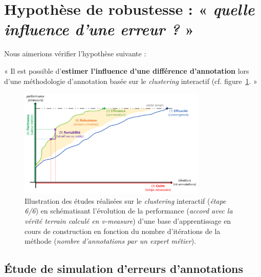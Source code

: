 \section{Hypothèse de robustesse : « \textit{quelle influence d'une erreur ?} »}
\label{section:4.6-HYPOTHESE-ROBUSTESSE}

	Nous aimerions vérifier l'hypothèse suivante :

	\begin{tcolorbox}[
		title=\faVial~\textbf{Hypothèse de robustesse}~\faVial,
		colback=colorTcolorboxHypothesis!15,  %
		colframe=colorTcolorboxHypothesis!75,  %
		width=\linewidth
	]
		« Il est possible d'\textbf{estimer l'influence d'une différence d'annotation} lors d'une méthodologie d'annotation basée sur le \textit{clustering} interactif (cf. figure~\ref{figure:4.6-HYPOTHESE-ROBUSTESSE}. »
		
		
		\begin{figure}[H]
			\centering
			\includegraphics[width=0.8\textwidth]{figures/hypotheses-06-robustesse}
			\caption{Illustration des études réalisées sur le \textit{clustering} interactif (\textit{étape 6/6}) en schématisant l'évolution de la performance (\textit{accord avec la vérité terrain calculé en v-measure}) d'une base d'apprentissage en cours de construction en fonction du nombre d'itérations de la méthode (\textit{nombre d'annotations par un expert métier}).}
			\label{figure:4.6-HYPOTHESE-ROBUSTESSE}
		\end{figure}

	\end{tcolorbox}
	
	\subsection{Étude de simulation d'erreurs d'annotations}
	
